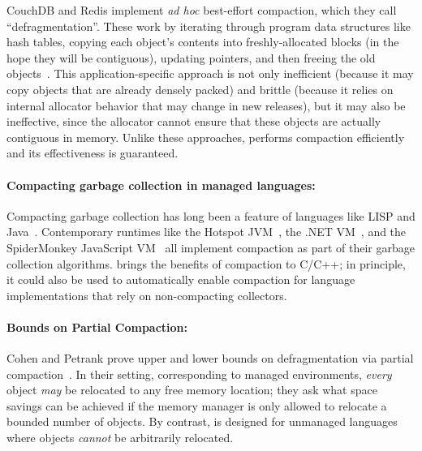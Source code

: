 CouchDB and Redis implement \emph{ad hoc} best-effort compaction,
which they call ``defragmentation''.  These work by iterating through
program data structures like hash tables, copying each object's
contents into freshly-allocated blocks (in the hope they will be
contiguous), updating pointers, and then freeing the old
objects~\cite{jemalloc:exposehints,redis:announcement}. This
application-specific approach is not only inefficient (because it may
copy objects that are already densely packed) and brittle (because it
relies on internal allocator behavior that may change in new
releases), but it may also be ineffective, since the allocator cannot
ensure that these objects are actually contiguous in memory. Unlike
these approaches, \Mesh performs compaction efficiently and its
effectiveness is guaranteed.

\paragraph*{Compacting garbage collection in managed languages:}
Compacting garbage collection has long been a feature of languages
like LISP and
Java~\cite{hansen:1969:compaction,fenichel:1969:compaction}. Contemporary
runtimes like the Hotspot JVM~\cite{microystems2006memory}, the .NET
VM~\cite{microsoft:dotnet-gc}, and the SpiderMonkey JavaScript
VM~\cite{mozilla:spidermonkey-compaction} all implement compaction as
part of their garbage collection algorithms. \Mesh{} brings the
benefits of compaction to C/C++; in principle, it could also be used
to automatically enable compaction for language implementations that
rely on non-compacting collectors.

\paragraph*{Bounds on Partial Compaction:}
Cohen and Petrank prove upper and lower bounds on defragmentation via
partial compaction~\cite{Cohen:2017:LPC:3050768.2994597,
  Cohen:2013:LPC:2491956.2491973}. In their setting, corresponding to
managed environments, \emph{every} object \emph{may} be relocated to
any free memory location; they ask what space savings can be achieved
if the memory manager is only allowed to relocate a bounded number of
objects. By contrast, \Mesh{} is designed for unmanaged languages
where objects \emph{cannot} be arbitrarily relocated.

